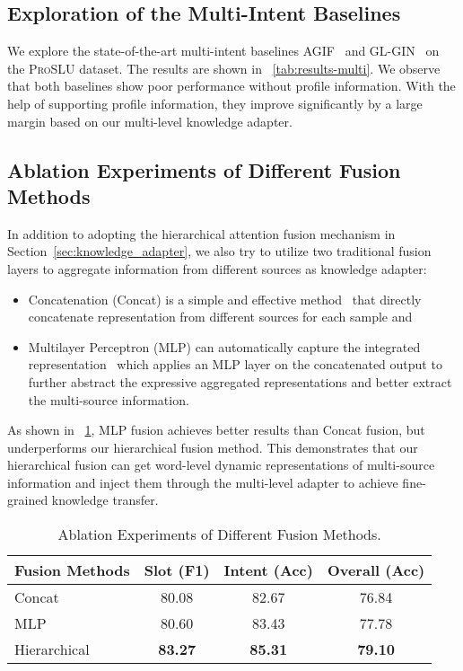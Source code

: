 \documentclass[letterpaper]{article} \usepackage{aaai22}  \usepackage{times}  \usepackage{helvet}  \usepackage{courier}  \usepackage[hyphens]{url}  \usepackage{graphicx} \urlstyle{rm} \def\UrlFont{\rm}  \usepackage{natbib}  \usepackage{caption} \DeclareCaptionStyle{ruled}{labelfont=normalfont,labelsep=colon,strut=off} \frenchspacing  \setlength{\pdfpagewidth}{8.5in}  \setlength{\pdfpageheight}{11in}  \usepackage{algorithm}
\begin{document}
\subsection{Exploration of the Multi-Intent Baselines} \label{sec:multi-intent}
We explore the state-of-the-art multi-intent baselines AGIF~\citep{qin-etal-2020-agif} and GL-GIN~\citep{qin-etal-2021-gl} on the \textsc{ProSLU} dataset.
The results are shown in \tablename~\ref{tab:results-multi}. 
We observe that both baselines show poor performance without profile information. With the help of supporting profile information, they improve significantly by a large margin based on our multi-level knowledge adapter.

\subsection{Ablation Experiments of Different Fusion Methods}

In addition to adopting the hierarchical attention fusion mechanism in Section~\ref{sec:knowledge_adapter}, we also try to utilize two traditional fusion layers to aggregate information from different sources as knowledge adapter:
\begin{itemize}
    \item Concatenation (Concat) is a simple and effective method~\citep{wu2018improving} that directly concatenate representation from different sources for each sample and
    \item Multilayer Perceptron (MLP) can automatically capture the integrated representation~\citep{nguyen2018improved} which applies an MLP layer on the concatenated output to further abstract the expressive aggregated representations and better extract the multi-source information.
\end{itemize}

As shown in \tablename~\ref{tab:results-ablation-fusion}, MLP fusion achieves better results than Concat fusion, 
but underperforms our hierarchical fusion method. This demonstrates that our hierarchical fusion can get word-level dynamic representations of multi-source information and inject them through the multi-level adapter to achieve fine-grained knowledge transfer.

\begin{table}[h]
	\centering
	\begin{adjustbox}{width=0.47\textwidth}
		\begin{tabular}{lccc}
			\toprule
            \textbf{Fusion Methods}
			& \textbf{Slot (F1)}  & \textbf{Intent (Acc)}   & \textbf{Overall (Acc)} \\ \midrule
			{Concat} & 80.08 & 82.67 & 76.84 \\
            {MLP} & 80.60 & 83.43 & 77.78 \\
            {Hierarchical} & \textbf{83.27} & \textbf{85.31} & \textbf{79.10} \\ 
            \bottomrule
		\end{tabular}
	\end{adjustbox}
	\caption{Ablation Experiments of Different Fusion Methods.}
	\label{tab:results-ablation-fusion}
\end{table} 
\end{document}
